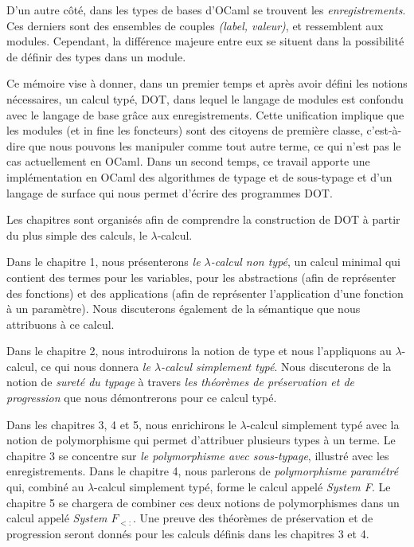 D'un autre côté, dans les types de bases d'OCaml se trouvent les
\textit{enregistrements}. Ces derniers sont des ensembles de couples
\textit{(label, valeur)}, et ressemblent aux modules. Cependant, la différence
majeure entre eux se situent dans la possibilité de définir des types dans un
module.

Ce mémoire vise à donner, dans un premier temps et après avoir défini les notions
nécessaires, un calcul typé, DOT\cite{WF-DOT-2016}, dans lequel le
langage de modules est confondu avec le langage de base grâce aux
enregistrements. Cette unification implique
que les modules (et in fine les foncteurs) sont des citoyens de première
classe, c'est-à-dire que nous pouvons les manipuler comme tout autre terme, ce qui
n'est pas le cas actuellement en OCaml.
Dans un second temps, ce travail apporte une implémentation en OCaml
des algorithmes de typage et de sous-typage et d'un langage de surface qui nous
permet d'écrire des programmes DOT.


Les chapitres sont organisés afin de comprendre la construction de DOT
à partir du plus simple des calculs, le $\lambda$-calcul.

Dans le chapitre 1, nous présenterons \textit{le $\lambda$-calcul non typé}, un calcul
minimal qui contient des termes pour les variables, pour les abstractions (afin
de représenter des fonctions) et des applications (afin de représenter
l'application d'une fonction à un paramètre). Nous discuterons également de la
sémantique que nous attribuons à ce calcul. 

Dans le chapitre 2, nous introduirons la notion de type et nous l'appliquons au
$\lambda$-calcul, ce qui nous donnera \textit{le $\lambda$-calcul simplement typé}. Nous
discuterons de la notion de \textit{sureté du typage} à travers \textit{les théorèmes
de préservation et de progression} que nous démontrerons pour ce calcul typé.

Dans les chapitres 3, 4 et 5, nous enrichirons le $\lambda$-calcul simplement
typé avec la notion de polymorphisme qui permet d'attribuer plusieurs types à un
terme. Le chapitre 3 se concentre sur \textit{le polymorphisme avec sous-typage},
illustré avec les enregistrements.
Dans le chapitre 4, nous parlerons de
\textit{polymorphisme paramétré} qui, combiné au $\lambda$-calcul simplement typé, forme
le calcul appelé \textit{System F}.
Le chapitre 5 se chargera de combiner ces deux notions de polymorphismes dans un
calcul appelé \textit{System $F_{<:}$}.
Une preuve des théorèmes de préservation et de progression seront donnés pour
les calculs définis dans les chapitres 3 et 4.

